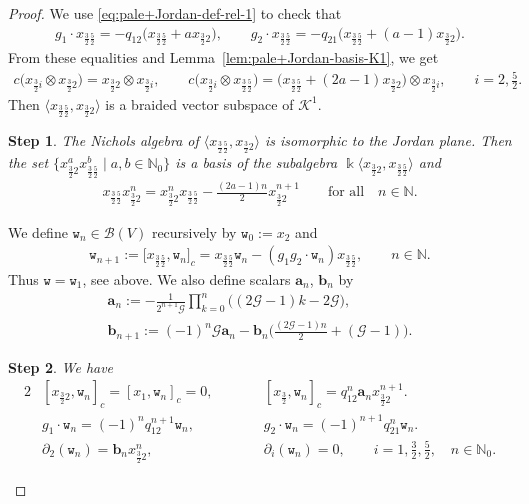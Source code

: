 \documentclass[10pt,a4paper]{amsart}
\numberwithin{equation}{section}
\newtheorem{stepv}{Step}
\newcommand{\toba}{\mathscr B}
\newcommand{\ghost}{\mathscr{G}}
\newcommand{\K}{{\mathcal{K}}}
\newcommand{\ab}{\mathbf a}
\newcommand{\bb}{\mathbf b}
\newcommand{\N}{{\mathbb N}}
\newcommand{\wt}{\mathtt{w}}
\newcommand{\tresdos}{\frac{3}{2}}
\newcommand{\cincodos}{\frac{5}{2}}
\begin{document}
\begin{proof} We use \eqref{eq:pale+Jordan-def-rel-1} to check that
\begin{align*}
g_1\cdot x_{\tresdos\cincodos}= -q_{12}\big(x_{\tresdos\cincodos}+ax_{\tresdos2}\big), \qquad
g_2\cdot x_{\tresdos\cincodos}= -q_{21}\big(x_{\tresdos\cincodos}+(a-1)x_{\tresdos2}\big).
\end{align*}
From these equalities and Lemma~\ref{lem:pale+Jordan-basis-K1}, we get
\begin{align*}%
c\big(x_{\tresdos i} \otimes x_{\tresdos2}\big) = x_{\tresdos2} \otimes x_{\tresdos i}, \qquad
c\big(x_{\tresdos i} \otimes x_{\tresdos\cincodos}\big) = \big(x_{\tresdos\cincodos}+(2a-1)x_{\tresdos2}\big) \otimes x_{\tresdos i}, \qquad
i = 2,\tfrac{5}{2}.
\end{align*}
Then $\langle x_{\tresdos\cincodos},x_{\tresdos2}\rangle$ is a braided vector subspace of $\K^1$.

\begin{stepv}
The Nichols algebra of $\langle x_{\tresdos\cincodos},x_{\tresdos2}\rangle$ is
isomorphic to the Jordan plane. Then the set $\big\{x_{\tresdos2}^a x_{\tresdos\cincodos}^b \mid a,b \in\N_0\big\}$
is a basis of the subalgebra $\Bbbk \big\langle x_{\tresdos2},x_{\tresdos\cincodos}\big\rangle$ and
\begin{align}\label{eq:pale+superJordan-def-rel-1}
x_{\tresdos\cincodos}x_{\tresdos2}^n = x_{\tresdos2}^nx_{\tresdos\cincodos} -\tfrac{(2a-1)n}{2}x_{\tresdos2}^{n+1} \qquad \text{for all} \quad n\in\N.
\end{align}
\end{stepv}

We define $\wt_n\in\toba(V)$ recursively by
$\wt_0 := x_2$ and
\begin{align*}
\wt_{n+1} := \big[x_{\tresdos\cincodos},\wt_n\big]_c =x_{\tresdos\cincodos}\wt_n -(g_1g_2\cdot \wt_n) x_{\tresdos\cincodos},\qquad
 n\in\N.
\end{align*}
Thus $\wt = \wt_1$, see above. We also define scalars $\ab_n$, $\bb_n$ by
\begin{gather*}
\ab_n := -\frac{1}{2^{n+1} \ghost}\prod_{k=0}^n \big((2\ghost -1)k-2 \ghost \big),
\\
\bb_{n+1} :=(-1)^{n} \ghost \ab_n -\bb_n \bigg(\frac{(2\ghost-1)n}{2}+(\ghost - 1)\bigg).
\end{gather*}

\begin{stepv}\label{lem:pale+superJordan-K1-action-derivations}
We have
\begin{alignat}{2}\label{eq:pale+superJordan-wn-adj-action}
&[x_{\tresdos2},\wt_n]_c = [x_1,\wt_n]_c =0,\qquad&&
[x_{\tresdos},\wt_n]_c = q_{12}^n\ab_n x_{\tresdos2}^{n+1}.
\\
\label{eq:pale+superJordan-action-wn}
&g_1\cdot \wt_n =(-1)^n q_{12}^{n+1} \wt_n,&&
g_2\cdot \wt_n =(-1)^{n+1} q_{21}^{n} \wt_n.
\\
\label{eq:pale+superJordan-derivations-wn}
&\partial_{2}(\wt_n) =\bb_n x_{\tresdos2}^{n}, &&\partial_{i}(\wt_n) =0, \qquad i=1,\tfrac32,\tfrac52, \quad n\in\N_0.
\end{alignat}
\end{stepv}


\end{proof}
\end{document}
